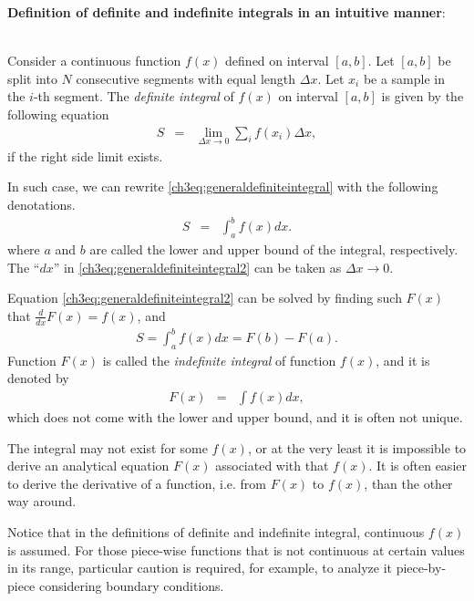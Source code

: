 \begin{mdframed}
\textbf{Definition of definite and indefinite integrals in an intuitive manner}:
\\
\\
\noindent

Consider a continuous function $f(x)$ defined on interval $[a, b]$. Let $[a, b]$ be split into $N$ consecutive segments with equal length $\Delta x$. Let $x_i$ be a sample in the $i$-th segment. The \textit{definite integral} of $f(x)$ on interval $[a, b]$ is given by the following equation
\begin{eqnarray}
    S &=& \lim_{\Delta x\rightarrow 0} \sum_i f(x_i)\Delta x, \label{ch3eq:generaldefiniteintegral}
\end{eqnarray}
if the right side limit exists.

In such case, we can rewrite \eqref{ch3eq:generaldefiniteintegral} with the following denotations.
\begin{eqnarray}
    S &=& \int_a^b f(x)dx. \label{ch3eq:generaldefiniteintegral2}
\end{eqnarray}
where $a$ and $b$ are called the lower and upper bound of the integral, respectively. The ``$dx$'' in \eqref{ch3eq:generaldefiniteintegral2} can be taken as $\Delta x \rightarrow 0$.

Equation \eqref{ch3eq:generaldefiniteintegral2} can be solved by finding such $F(x)$ that $\frac{d}{dx}F(x) = f(x)$, and
\begin{eqnarray}
    S = \int_a^b f(x)dx = F(b) - F(a). \label{ch3eq:calculatedefiniteintegral}
\end{eqnarray}
Function $F(x)$ is called the \textit{indefinite integral} of function $f(x)$, and it is denoted by
\begin{eqnarray}
    F(x) &=& \int f(x)dx, \nonumber
\end{eqnarray}
which does not come with the lower and upper bound, and it is often not unique.

\end{mdframed}

The integral may not exist for some $f(x)$, or at the very least it is impossible to derive an analytical equation $F(x)$ associated with that $f(x)$. It is often easier to derive the derivative of a function, i.e. from $F(x)$ to $f(x)$, than the other way around.

Notice that in the definitions of definite and indefinite integral, continuous $f(x)$ is assumed. For those piece-wise functions that is not continuous at certain values in its range, particular caution is required, for example, to analyze it piece-by-piece considering boundary conditions.

